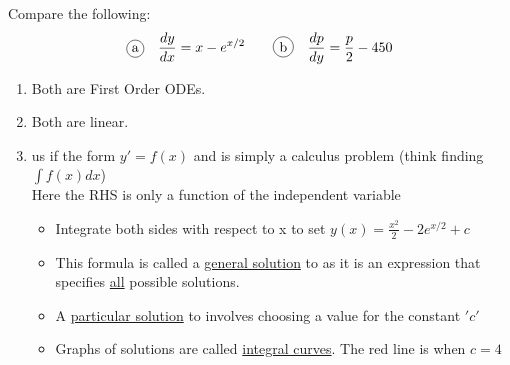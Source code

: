 
Compare the following:
\begin{equation*}
	\circled{a} \quad \frac{dy}{dx} = x - e^{x/2} \quad \quad
	\circled{b} \quad \frac{dp}{dy} = \dfrac{p}{2} - 450
\end{equation*}

\begin{enumerate}[label=\protect\circled{\arabic*}]
	\item Both are First Order ODEs.
	\item Both are linear.
	\item {} us if the form $y' = f(x)$ and is simply a calculus problem (think finding $\int f(x) dx$)\\ Here the RHS is only a function of the independent variable
	\begin{itemize}
		\item Integrate both sides with respect to x to set $y(x) = \frac{x^2}{2} - 2e^{x/2} + c$
		\item This formula is called a \underline{general solution} to  as it is an expression that specifies \underline{all} possible solutions.
		\item A \underline{particular solution} to  involves choosing a value for the constant $'c'$
		\item Graphs of solutions are called \underline{integral curves}. The red line is when $c = 4$\\
		\begin{center}
\end{center}
\end{itemize}
\end{enumerate}
